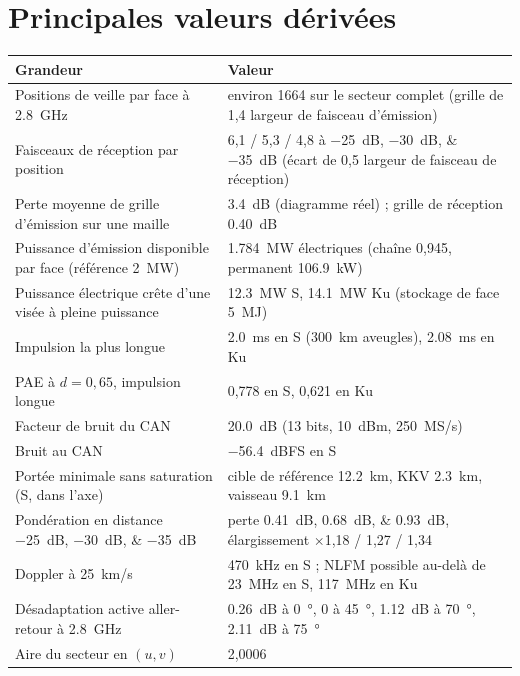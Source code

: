 \documentclass[11pt,a4paper]{article}
\begin{document}
\appendix
\section{Principales valeurs dérivées}
\begin{center}
\begin{tabularx}{\linewidth}{@{}lL@{}}
\toprule
Grandeur & Valeur\\
\midrule
Positions de veille par face à \SI{2.8}{GHz} & environ \num{1664} sur le secteur complet (grille de 1,4 largeur de
faisceau d'émission)\\
Faisceaux de réception par position & 6,1 / 5,3 / 4,8 à \SIlist{-25;-30;-35}{dB} (écart de 0,5 largeur de faisceau de
réception)\\
Perte moyenne de grille d'émission sur une maille & \SI{3.4}{dB} (diagramme réel) ; grille de réception \SI{0.40}{dB}\\
Puissance d'émission disponible par face (référence \SI{2}{MW}) & \SI{1.784}{MW} électriques (chaîne 0,945, permanent
\SI{106.9}{kW})\\
Puissance électrique crête d'une visée à pleine puissance & \SI{12.3}{MW} S, \SI{14.1}{MW} Ku (stockage de face
\SI{5}{MJ})\\
Impulsion la plus longue & \SI{2.0}{ms} en S (\SI{300}{km} aveugles), \SI{2.08}{ms} en Ku\\
PAE à $d=0,65$, impulsion longue & 0,778 en S, 0,621 en Ku\\
Facteur de bruit du CAN & \SI{20.0}{dB} (13 bits, \SI{+10}{dBm}, \SI{250}{MS/s})\\
Bruit au CAN & \SI{-56.4}{dBFS} en S\\
Portée minimale sans saturation (S, dans l'axe) & cible de référence \SI{12.2}{km}, KKV \SI{2.3}{km}, vaisseau
\SI{9.1}{km}\\
Pondération en distance \SIlist{-25;-30;-35}{dB} & perte \SIlist{0.41;0.68;0.93}{dB}, élargissement $\times$1,18 / 1,27 /
1,34\\
Doppler à \SI{25}{km/s} & \SI{470}{kHz} en S ; NLFM possible au-delà de \SI{23}{MHz} en S, \SI{117}{MHz} en Ku\\
Désadaptation active aller-retour à \SI{2.8}{GHz} & \SI{0.26}{dB} à \SI{0}{\degree}, 0 à \SI{45}{\degree},
\SI{1.12}{dB} à \SI{70}{\degree}, \SI{2.11}{dB} à \SI{75}{\degree}\\
Aire du secteur en $(u,v)$ & 2,0006\\
\bottomrule
\end{tabularx}
\end{center}
\end{document}
